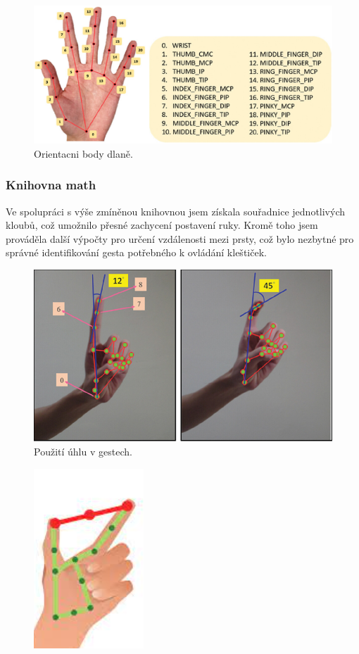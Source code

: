 \documentclass[12pt, a4paper,
twoside,        %
openright
]{report}
\begin{document}
{\begin{figure}[h]
	\centering
	\includegraphics[width=0.8\linewidth]{image/orientacniBody.jpg} 
	
	
	\caption{Orientacni body dlaně.} %
	\label{fig:obvod} %
\end{figure}

\subsubsection{Knihovna math}

Ve spolupráci s výše zmíněnou knihovnou jsem získala souřadnice jednotlivých kloubů, což umožnilo přesné zachycení postavení ruky. Kromě toho jsem prováděla další výpočty pro určení vzdálenosti mezi prsty, což bylo nezbytné pro správné identifikování gesta potřebného k ovládání kleštiček.

\begin{figure}[h]
	
	\centering
	\includegraphics[width=0.4\linewidth]{image/prikladGesta.PNG} 
	
	
	\caption{Použití úhlu v gestech.} %
	\label{fig:uhlyVGestech} %
\end{figure}
\begin{figure}[h]
	
	\centering
	\includegraphics[width=0.2\linewidth]{image/vzdalenost.PNG} 
	

\end{figure}}
\end{document}
